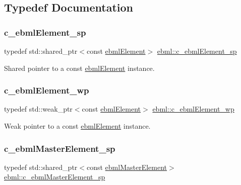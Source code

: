 \subsection{Typedef Documentation}
\mbox{\label{namespaceebml_a2deef4e8071531b32e3533f1bf978917}} 
\subsubsection{\texorpdfstring{c\+\_\+ebml\+Element\+\_\+sp}{c\_ebmlElement\_sp}}
{\footnotesize\ttfamily typedef std\+::shared\+\_\+ptr$<$const \mbox{\hyperlink{classebml_1_1ebmlElement}{ebml\+Element}}$>$ \mbox{\hyperlink{namespaceebml_a2deef4e8071531b32e3533f1bf978917}{ebml\+::c\+\_\+ebml\+Element\+\_\+sp}}}

Shared pointer to a const \mbox{\hyperlink{classebml_1_1ebmlElement}{ebml\+Element}} instance. \mbox{\label{namespaceebml_abc218c2fc1444b2fd8a8a5fae67e0151}} 
\subsubsection{\texorpdfstring{c\+\_\+ebml\+Element\+\_\+wp}{c\_ebmlElement\_wp}}
{\footnotesize\ttfamily typedef std\+::weak\+\_\+ptr$<$const \mbox{\hyperlink{classebml_1_1ebmlElement}{ebml\+Element}}$>$ \mbox{\hyperlink{namespaceebml_abc218c2fc1444b2fd8a8a5fae67e0151}{ebml\+::c\+\_\+ebml\+Element\+\_\+wp}}}

Weak pointer to a const \mbox{\hyperlink{classebml_1_1ebmlElement}{ebml\+Element}} instance. \mbox{\label{namespaceebml_a7a62721c59c06de6cadf348c51eabe1c}} 
\subsubsection{\texorpdfstring{c\+\_\+ebml\+Master\+Element\+\_\+sp}{c\_ebmlMasterElement\_sp}}
{\footnotesize\ttfamily typedef std\+::shared\+\_\+ptr$<$const \mbox{\hyperlink{classebml_1_1ebmlMasterElement}{ebml\+Master\+Element}}$>$ \mbox{\hyperlink{namespaceebml_a7a62721c59c06de6cadf348c51eabe1c}{ebml\+::c\+\_\+ebml\+Master\+Element\+\_\+sp}}}

